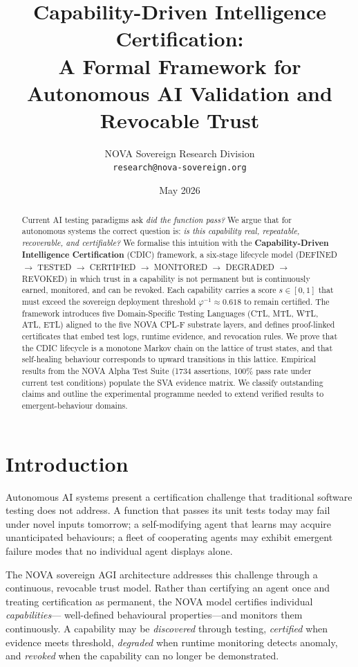 \documentclass[11pt,a4paper]{article}
\title{Capability-Driven Intelligence Certification:\\
A Formal Framework for Autonomous AI Validation and Revocable Trust}
\author{
  NOVA Sovereign Research Division \\
  \texttt{research@nova-sovereign.org}
}
\date{May 2026}
\begin{document}
\maketitle

\begin{abstract}
Current AI testing paradigms ask \emph{did the function pass?}  We argue that for
autonomous systems the correct question is: \emph{is this capability real, repeatable,
recoverable, and certifiable?}  We formalise this intuition with the
\textbf{Capability-Driven Intelligence Certification} (CDIC) framework, a six-stage
lifecycle model (DEFINED $\to$ TESTED $\to$ CERTIFIED $\to$ MONITORED $\to$ DEGRADED
$\to$ REVOKED) in which trust in a capability is not permanent but is continuously
earned, monitored, and can be revoked.  Each capability carries a score $s \in [0,1]$
that must exceed the sovereign deployment threshold $\varphi^{-1} \approx 0.618$ to
remain certified.  The framework introduces five Domain-Specific Testing Languages
(CTL, MTL, WTL, ATL, ETL) aligned to the five NOVA CPL-F substrate layers, and defines
proof-linked certificates that embed test logs, runtime evidence, and revocation rules.
We prove that the CDIC lifecycle is a monotone Markov chain on the lattice of trust
states, and that self-healing behaviour corresponds to upward transitions in this lattice.
Empirical results from the NOVA Alpha Test Suite (1734 assertions, 100\% pass rate under
current test conditions) populate the SVA evidence matrix.  We classify outstanding
claims and outline the experimental programme needed to extend verified results to
emergent-behaviour domains.
\end{abstract}

\tableofcontents
\newpage

\section{Introduction}
\label{sec:intro}

Autonomous AI systems present a certification challenge that traditional software
testing does not address.  A function that passes its unit tests today may fail under
novel inputs tomorrow; a self-modifying agent that learns may acquire unanticipated
behaviours; a fleet of cooperating agents may exhibit emergent failure modes that no
individual agent displays alone.

The NOVA sovereign AGI architecture \cite{nova_paper3} addresses this challenge through
a continuous, revocable trust model.  Rather than certifying an agent once and treating
certification as permanent, the NOVA model certifies individual \emph{capabilities}—
well-defined behavioural properties—and monitors them continuously.  A capability may
be \emph{discovered} through testing, \emph{certified} when evidence meets threshold,
\emph{degraded} when runtime monitoring detects anomaly, and \emph{revoked} when the
capability can no longer be demonstrated.
\end{document}
